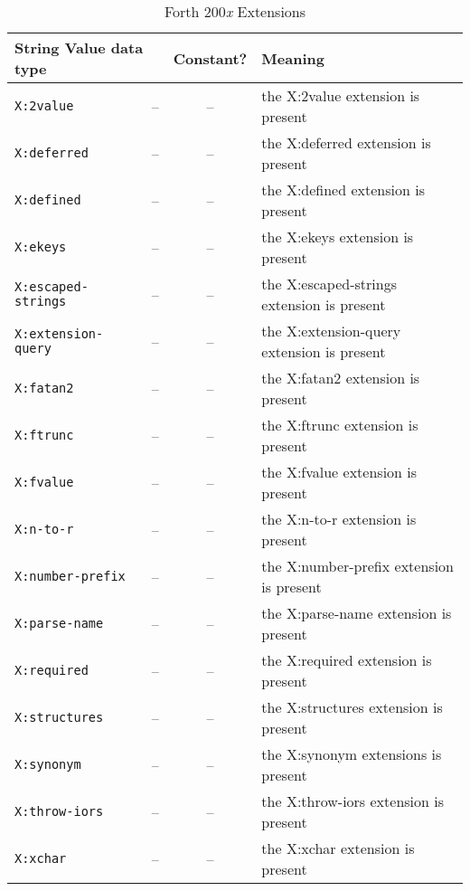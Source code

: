 \begin{table}[ht]
  \begin{center}
	\caption{Forth 200\emph{x} Extensions}
	\label{table:extensions}
	\begin{tabular}{p{11em}rcp{}}
		\hline\hline
		\multicolumn{2}{l}{String \hfill Value data type} & Constant? & Meaning \\
		\hline
		\texttt{X:2value}				& -- & -- & the \textsf{X:2value} extension is present \\
		\texttt{X:deferred}			& -- & -- & the \textsf{X:deferred} extension is present \\
		\texttt{X:defined}			& -- & -- & the \textsf{X:defined} extension is present \\
		\texttt{X:ekeys}				& -- & -- & the \textsf{X:ekeys} extension is present \\
		\texttt{X:escaped-strings} & -- & -- & the \textsf{X:escaped-strings} extension is present \\
		\texttt{X:extension-query}	& -- & -- & the \textsf{X:extension-query} extension is present\\
		\texttt{X:fatan2}				& -- & -- & the \textsf{X:fatan2} extension is present \\
		\texttt{X:ftrunc}				& -- & -- & the \textsf{X:ftrunc} extension is present \\
		\texttt{X:fvalue}				& -- & -- & the \textsf{X:fvalue} extension is present \\
		\texttt{X:n-to-r}				& -- & -- & the \textsf{X:n-to-r} extension is present \\
		\texttt{X:number-prefix}	& -- & -- & the \textsf{X:number-prefix} extension is present \\
		\texttt{X:parse-name}		& -- & -- & the \textsf{X:parse-name} extension is present \\
		\texttt{X:required}			& -- & -- & the \textsf{X:required} extension is present \\
		\texttt{X:structures}		& -- & -- & the \textsf{X:structures} extension is present \\
		\texttt{X:synonym}			& -- & -- & the \textsf{X:synonym} extensions is present \\
		\texttt{X:throw-iors}		& -- & -- & the \textsf{X:throw-iors} extension is present \\
		\texttt{X:xchar}				& -- & -- & the \textsf{X:xchar} extension is present \\
		\hline\hline
	\end{tabular}
  \end{center}
\end{table}


